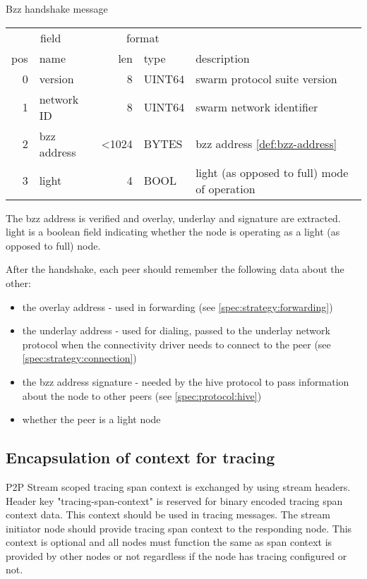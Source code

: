 \begin{definition}{Bzz handshake message}\label{def:bzz-handshake}

\begin{tabular}{r|l|r|l|l}
\multicolumn{2}{c|}{field}& 
\multicolumn{2}{c|}{format}& 
\\
pos & name  & len & type & description \\\hline
0  & version & 8 & UINT64 & swarm protocol suite version\\\hline
1  & network ID & 8 & UINT64 & swarm network identifier\\\hline
2 & bzz address & <1024 & BYTES & bzz address \ref{def:bzz-address}\\\hline
3 & light & 4 & BOOL & light (as opposed to full) mode of operation
\end{tabular}
\end{definition}

The bzz address is verified and overlay, underlay and signature are extracted.
light is a boolean field indicating whether the node is operating as a light (as opposed to full) node.

After the handshake,  each peer should remember the following data about the other:

\begin{itemize}
    \item the overlay address - used in forwarding  (see  \ref{spec:strategy:forwarding})
    \item the underlay address - used for dialing, passed to the underlay network protocol when the connectivity driver needs to connect to the peer (see \ref{spec:strategy:connection})
    \item the bzz address signature - needed by the hive protocol to pass information about the node to other peers (see \ref{spec:protocol:hive})
    \item whether the peer is a light node
\end{itemize}

\subsection{Encapsulation of context for tracing \statusgreen}

P2P Stream scoped tracing span context is exchanged by using stream headers. Header key "tracing-span-context" is reserved for binary encoded tracing span context data. This context should be used in tracing messages. The stream initiator node should provide tracing span context to the responding node. This context is optional and all nodes must function the same as span context is provided by other nodes or not regardless if the node has tracing configured or not.



